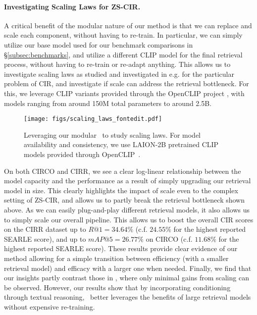 \documentclass{article} \usepackage{iclr2024_conference,times}
\begin{document}
\paragraph{Investigating Scaling Laws for ZS-CIR.} A critical benefit of the modular nature of our method is that we can replace and scale each component, without having to re-train. In particular, we can simply utilize our base model used for our benchmark comparisons in \S\ref{subsec:benchmarks}, and utilize a different CLIP model for the final retrieval process, without having to re-train or re-adapt anything.
This allows us to investigate scaling laws as studied and investigated in e.g. \citet{kaplan2020scaling,caballero2022broken,cherti2023reproducible} for the particular problem of CIR, and investigate if scale can address the retrieval bottleneck.
For this, we leverage CLIP variants provided through the OpenCLIP project \citep{openclip}, with models ranging from around 150M total parameters to around 2.5B. 
\begin{figure}[t]
    \centering
    \texttt{[image: figs/scaling\_laws\_fontedit.pdf]}
    \vspace{-23pt}
    \caption{Leveraging our modular \methodNameNS\ to study scaling laws. For model availability and consistency, 
    we use LAION-2B pretrained CLIP models provided through OpenCLIP~\citep{openclip}.}
    \label{fig:scaling_laws}
\vspace{-8pt}
\end{figure} On both CIRCO and CIRR, we see a clear log-linear relationship between the model capacity and the performance as a result of simply upgrading our retrieval model in size. This clearly highlights the impact of scale even to the complex setting of ZS-CIR, and allows us to partly break the retrieval bottleneck shown above.
As we can easily plug-and-play different retrieval models, it also allows us to simply scale our overall pipeline. This allows us to boost the overall CIR scores on the CIRR dataset up to $R@1=34.64\%$ (c.f. $24.55\%$ for the highest reported SEARLE score), and up to $mAP@5=26.77\%$ on CIRCO (c.f. $11.68\%$ for the highest reported SEARLE score).
These results provide clear evidence of our method allowing for a simple transition between efficiency (with a smaller retrieval model) and efficacy with a larger one when needed.
Finally, we find that our insights partly contrast those in \cite{vaze2023genecis}, where only minimal gains from scaling can be observed. However, our results show that by incorporating conditioning through textual reasoning, \methodNameNS\  better leverages the benefits of large retrieval models without expensive re-training.
\end{document}
